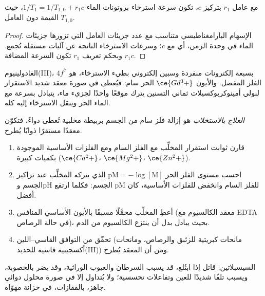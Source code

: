 \begin{proposition}\label{prop:b3:bioinorganic:relaxivity}
مع عامل  $r_1$ بتركيز $c$، تكون سرعة استرخاء بروتونات
الماء $1/T_1 = 1/T_{1,0} + r_1c$، حيث $T_{1,0}$ القيمة دون العامل.
\end{proposition}

\begin{proof}
الإسهام البارامغناطيسي متناسب مع عدد جزيئات العامل
التي تزورها جزيئات الماء في وحدة الزمن، أي مع $c$؛ وسرعات الاسترخاء الناتجة عن
آليات مستقلة تُجمع. وبحكم تعريف $r_1$ تكون السرعة المضافة $r_1c$.
\end{proof}

الغادولينيوم(III)، $4f^7$ بسبعة إلكترونات منفردة وسبين إلكتروني بطيء
الاسترخاء، هو الفلز المفضل. والأيون $\ce{Gd^3+}$ الحر سام: فيُعطى في صورة
معقد شديد الاستقرار لبولي أمينوكربوكسيلات ثماني التسنين يترك موقعًا
واحدًا لجزيء ماء، يتبادل بسرعة مع الماء الحر وينقل
الاسترخاء إليه كله.

\begin{definition}\label{def:b3:bioinorganic:chelation-therapy}
\emph{العلاج بالاستخلاب} هو إزالة فلز سام
من الجسم بربيطة مخلبية تُعطى دواءً، فتكوّن معقدًا مستقرًا
ذوابًا يُطرح.
\end{definition}

\begin{method}\label{met:b3:bioinorganic:choose-chelator}
\begin{enumerate}
  \item قارن ثوابت استقرار المخلِّب مع الفلز السام
        ومع الفلزات الأساسية الموجودة بكميات كبيرة ($\ce{Ca^2+}$، $\ce{Mg^2+}$،
        $\ce{Zn^2+}$).
  \item احسب مستوى الفلز الحر $\mathrm{pM} = -\log[\mathrm M]$ الذي يتركه المخلِّب عند
        تراكيز الجسم وpH الجسم: فكلما ارتفع pM للفلز السام 
        وانخفض للفلزات الأساسية، كان أفضل.
  \item أعطِ المخلِّب محمَّلًا مسبقًا بالأيون الأساسي المنافس (معقد
        الكالسيوم مع EDTA في حالة الرصاص)، بحيث يبادل بدل أن
        ينتزع الكالسيوم من الدم.
  \item تحقّق من التوافق القاسي--اللين (مانحات كبريتية للزئبق والرصاص، ومانحات
        أكسجينية قاسية للحديد(III)) ومن أن المعقد يُطرح.
\end{enumerate}
\end{method}

\begin{safety}{}
السيسبلاتين: قاتل إذا ابتُلع، قد يسبب السرطان والعيوب الوراثية، وقد يضر
بالخصوبة، ويسبب تلفًا شديدًا للعين وتفاعلات تحسسية؛ ولا يُتداول
إلا في صورة محلول دوائي جاهز، بالقفازات، في خزانة مهوّاة.
\end{safety}

